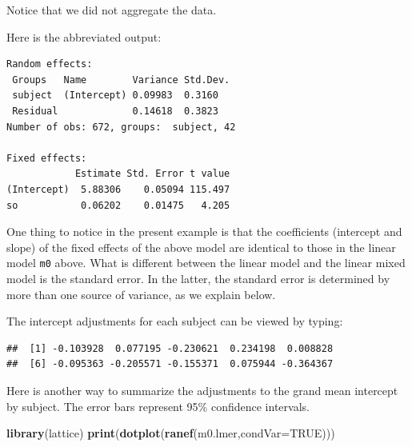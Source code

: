 \documentclass[12pt,]{krantz}
\newenvironment{Shaded}{\begin{snugshade}}{\end{snugshade}}
\newcommand{\CommentTok}[1]{\textcolor[rgb]{0.56,0.35,0.01}{\textit{#1}}}
\newcommand{\DataTypeTok}[1]{\textcolor[rgb]{0.13,0.29,0.53}{#1}}
\newcommand{\DecValTok}[1]{\textcolor[rgb]{0.00,0.00,0.81}{#1}}
\newcommand{\KeywordTok}[1]{\textcolor[rgb]{0.13,0.29,0.53}{\textbf{#1}}}
\newcommand{\NormalTok}[1]{#1}
\newcommand{\OperatorTok}[1]{\textcolor[rgb]{0.81,0.36,0.00}{\textbf{#1}}}
\newcommand{\OtherTok}[1]{\textcolor[rgb]{0.56,0.35,0.01}{#1}}
\begin{document}
Notice that we did not aggregate the data.

Here is the abbreviated output:

\begin{verbatim}
Random effects:
 Groups   Name        Variance Std.Dev.
 subject  (Intercept) 0.09983  0.3160  
 Residual             0.14618  0.3823  
Number of obs: 672, groups:  subject, 42

Fixed effects:
            Estimate Std. Error t value
(Intercept)  5.88306    0.05094 115.497
so           0.06202    0.01475   4.205
\end{verbatim}

One thing to notice in the present example is that the coefficients (intercept and slope) of the fixed effects of the above model are identical to those in the linear model \texttt{m0} above. What is different between the linear model and the linear mixed model is the standard error. In the latter, the standard error is determined by more than one source of variance, as we explain below.

The intercept adjustments for each subject can be viewed by typing:

\begin{Shaded}
\end{Shaded}

\begin{verbatim}
##  [1] -0.103928  0.077195 -0.230621  0.234198  0.008828
##  [6] -0.095363 -0.205571 -0.155371  0.075944 -0.364367
\end{verbatim}

Here is another way to summarize the adjustments to the grand mean intercept by subject. The error bars represent 95\% confidence intervals.

\begin{Shaded}
\begin{Highlighting}[]
\KeywordTok{library}\NormalTok{(lattice)}
\KeywordTok{print}\NormalTok{(}\KeywordTok{dotplot}\NormalTok{(}\KeywordTok{ranef}\NormalTok{(m0.lmer,}\DataTypeTok{condVar=}\OtherTok{TRUE}\NormalTok{)))}
\end{Highlighting}
\end{Shaded}
\end{document}
